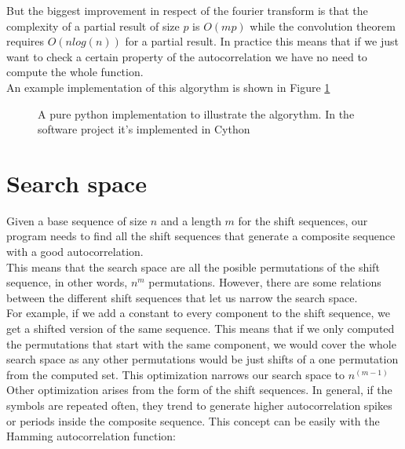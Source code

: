       But the biggest improvement in respect of the fourier transform is that
      the complexity of a partial result of size $p$ is $O(mp)$ while the
      convolution theorem requires $O(nlog(n))$ for a partial result. In
      practice this means that if we just want to check a certain property
      of the autocorrelation we have no need to compute the whole function.\\

      An example implementation of this algorythm is shown in Figure \ref{composite_auto:fig:1}

      \begin{figure}[ht!]
        \caption{A pure python implementation to illustrate the algorythm. In
        the software project it's implemented in Cython}
        \label{composite_auto:fig:1}
      \end{figure}

  \section{Search space}

  Given a base sequence of size $n$ and a length $m$ for the shift sequences,
  our program needs to find all the shift sequences that generate a composite
  sequence with a good autocorrelation.\\

  This means that the search space are all the posible permutations of the
  shift sequence, in other words, $n^m$ permutations. However, there are some
  relations between the different shift sequences that let us narrow the
  search space.\\

  For example, if we add a constant to every component to the shift sequence,
  we get a shifted version of the same sequence. This means that if we only
  computed the permutations that start with the same component, we would cover
  the whole search space as any other permutations would be just shifts of
  a one permutation from the computed set. This optimization narrows our
  search space to $n^{(m-1)}$\\

  Other optimization arises from the form of the shift sequences. In general,
  if the symbols are repeated often, they trend to generate higher
  autocorrelation spikes or periods inside the composite sequence. This
  concept can be easily with the Hamming autocorrelation function:\\


